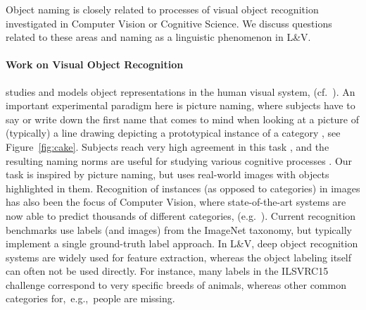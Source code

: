 
Object naming is closely related to processes of visual object recognition investigated in Computer Vision or Cognitive Science.
We discuss questions related to these areas and naming as a linguistic phenomenon in L\&V.

\paragraph{Work on Visual Object Recognition} studies and models object representations in the human visual system, (cf.\ ). 
An important experimental paradigm here is picture naming, where subjects have to say or write down the first name that comes to mind when looking at a picture of (typically) a line drawing depicting a prototypical instance of a category \cite{snodgrass}, see Figure\ \ref{fig:cake}.
Subjects reach very high agreement in this task \cite{rossion2004revisiting}, and the resulting naming norms are useful for studying various cognitive processes \cite{humphreys1988cascade}.
Our task is inspired by picture naming, but uses real-world images with objects highlighted in them.
Recognition of instances (as opposed to categories) in images has also been the focus of Computer Vision, where state-of-the-art systems are now able to predict thousands of different categories, (e.g.\ ). 
Current recognition benchmarks use labels (and images) from the ImageNet \cite{imagenet_cvpr09} taxonomy, but typically implement a single ground-truth label approach. 
In L\&V, deep object recognition systems are widely used for feature extraction, whereas the object labeling itself can often not be used directly. For instance, many labels in the ILSVRC15 challenge correspond to very specific breeds of animals, whereas other common categories  for,\ e.g.,\ people are missing.


